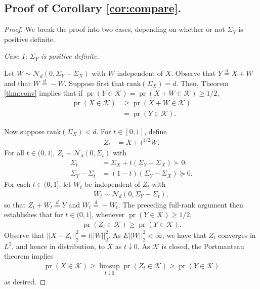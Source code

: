 \documentclass[11pt]{article}
\newcommand{\1}{\mathbbm{1}}
\def\pr{{\operatorname{pr}}}
\theoremstyle{plain}
\theoremstyle{definition}
\begin{document}
\subsection{Proof of Corollary \ref{cor:compare}.}
\begin{proof}
We break the proof into two cases, depending on whether or not $\Sigma_Y$ is positive definite.

\medskip
\noindent\textit{Case 1: $\Sigma_Y$ is positive definite.}

Let $W \sim \mathcal{N}_d(0, \Sigma_Y-\Sigma_X)$ with $W$ independent of $X$. Observe that $Y \overset{d}{=}X+W$ and that $W\overset{d}{=} -W$.
Suppose first that $\text{rank}(\Sigma_X) = d$. Then, Theorem \ref{thm:conv} implies that if $\pr(Y\in \mathcal{K}) = \pr(X+W \in \mathcal{K})\geq 1/2$, 
\begin{align*} \pr(X\in \mathcal{K})&\geq \pr(X+W\in \mathcal{K})\\ &= \pr(Y\in \mathcal{K}).\end{align*}

Now suppose $\text{rank}(\Sigma_X) < d$. For $t \in [0,1]$, define 
\begin{align*} Z_t &= X + t^{1/2}W.
\end{align*} For all $t\in(0,1]$, $Z_t \sim \mathcal{N}_d(0,\Sigma_t)$ with 
\begin{align*} \Sigma_t &= \Sigma_X+t(\Sigma_Y-\Sigma_X) \succ 0;\\ \Sigma_Y-\Sigma_t &= (1-t)(\Sigma_Y-\Sigma_X) \succeq 0.\end{align*} For each $t\in (0,1]$, let $W_t$ be independent of $Z_t$ with 
\begin{align*}W_t \sim \mathcal{N}_d(0, \Sigma_Y-\Sigma_t),
\end{align*}so that $Z_t+W_t \overset{d}{=} Y$ and $W_t \overset{d}{=} -W_t$. The preceding full-rank argument then establishes that for $t \in (0,1]$, whenever $\pr(Y\in \mathcal{K})\geq 1/2$,\begin{align*}\pr(Z_t \in \mathcal{K}) \geq \pr(Y\in\mathcal{K}).\end{align*}Observe that $||X - Z_t||_2^2 = t||W||_2^2$. As $E||W||^2_2 < \infty$, we have that $Z_t$ converges in $L^2$, and hence in distribution, to $X$ as $t\downarrow 0$. As $\mathcal{K}$ is closed, the Portmanteau theorem implies 
\begin{align*}\operatorname{pr}(X\in \mathcal{K}) \geq \limsup_{t\downarrow 0}\operatorname{pr}(Z_t \in \mathcal{K})\geq \operatorname{pr}(Y\in \mathcal{K})\end{align*} as desired.


\end{proof}
\end{document}
